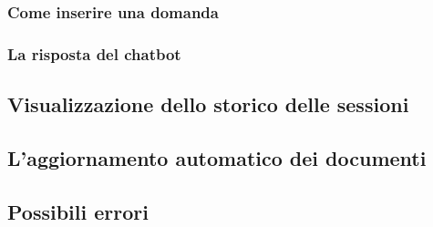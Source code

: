 \subsubsection{Come inserire una domanda}

\subsubsection{La risposta del chatbot}


\subsection{Visualizzazione dello storico delle sessioni}


\subsection{L'aggiornamento automatico dei documenti}


\subsection{Possibili errori}
